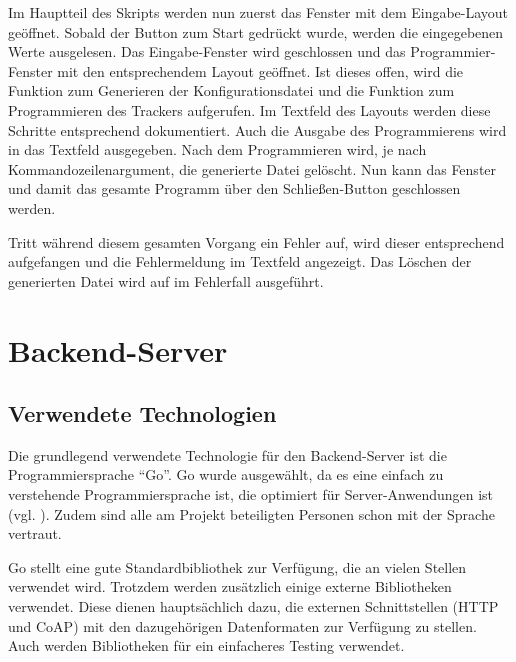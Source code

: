 Im Hauptteil des Skripts werden nun zuerst das Fenster mit dem Eingabe-Layout geöffnet.
Sobald der Button zum Start gedrückt wurde, werden die eingegebenen Werte ausgelesen.
Das Eingabe-Fenster wird geschlossen und das Programmier-Fenster mit den entsprechendem Layout geöffnet.
Ist dieses offen, wird die Funktion zum Generieren der Konfigurationsdatei und die Funktion zum Programmieren des Trackers aufgerufen.
Im Textfeld des Layouts werden diese Schritte entsprechend dokumentiert.
Auch die Ausgabe des Programmierens wird in das Textfeld ausgegeben.
Nach dem Programmieren wird, je nach Kommandozeilenargument, die generierte Datei gelöscht.
Nun kann das Fenster und damit das gesamte Programm über den Schließen-Button geschlossen werden.

Tritt während diesem gesamten Vorgang ein Fehler auf, wird dieser entsprechend aufgefangen und die Fehlermeldung im Textfeld angezeigt.
Das Löschen der generierten Datei wird auf im Fehlerfall ausgeführt.

\section{Backend-Server}

\subsection{Verwendete Technologien} \label{sec:impl-server-technology}

Die grundlegend verwendete Technologie für den Backend-Server ist die Programmiersprache \enquote{Go}.
Go wurde ausgewählt, da es eine einfach zu verstehende Programmiersprache ist, die optimiert für Server-Anwendungen ist (vgl. \cite{Weigend2019}).
Zudem sind alle am Projekt beteiligten Personen schon mit der Sprache vertraut.

Go stellt eine gute Standardbibliothek zur Verfügung, die an vielen Stellen verwendet wird.
Trotzdem werden zusätzlich einige externe Bibliotheken verwendet.
Diese dienen hauptsächlich dazu, die externen Schnittstellen (\gls{HTTP} und \gls{CoAP}) mit den dazugehörigen Datenformaten zur Verfügung zu stellen.
Auch werden Bibliotheken für ein einfacheres Testing verwendet.

